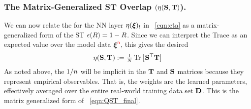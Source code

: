 \subsubsection{The Matrix-Generalized ST Overlap 
\texorpdfstring{$(\eta({\mathbf{S}},{\mathbf{T}})$)}{ETA(S, T)}.}
We can now relate the \SelfOverlap for the NN layer $\eta(\boldsymbol{\xi})_{l}$ in \EQN~\ref{eqn:eta}
as a matrix-generalized form of the ST \EffectivePotential $\epsilon(R)=1-R$.
Since we can interpret the Trace as an expected value over the model data $\boldsymbol{\xi}^{{\color{red}\sf{n}}}$, this gives the desired
\begin{align}
  \label{eqn:eta_mat_avg_def}
  \eta({\mathbf{S}},{\mathbf{T}})
  :=\tfrac{1}{N} \mbox{}\operatorname{Tr}\left[{\mathbf{S}}^{\top}{\mathbf{T}}\right] 
\end{align}
As noted above, the $1/n$ will be implicit in the ${\mathbf{T}}$ and ${\mathbf{S}}$ matrices because they represent empirical observables. That is, the weights are the learned parameters, effectively averaged over the entire real-world training data set $\mathbf{D}$.
This is the matrix generalized form of \EQN~\ref{eqn:QST_final}.

